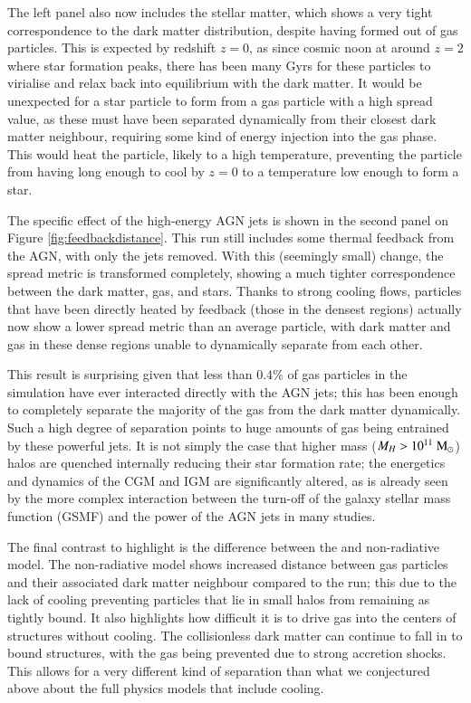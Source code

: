 The left panel also now includes the stellar matter, which shows a very tight
correspondence to the dark matter distribution, despite having formed out of
gas particles. This is expected by redshift $z=0$, as since cosmic noon at
around $z=2$ where star formation peaks, there has been many Gyrs for these
particles to virialise and relax back into equilibrium with the dark matter.
It would be unexpected for a star particle to form from a gas particle with a
high spread value, as these must have been separated dynamically from their
closest dark matter neighbour, requiring some kind of energy injection into
the gas phase. This would heat the particle, likely to a high temperature,
preventing the particle from having long enough to cool by $z=0$ to a
temperature low enough to form a star.

The specific effect of the high-energy AGN jets is shown in the second panel
on Figure \ref{fig:feedbackdistance}. This \nojet{} run still includes some
thermal feedback from the AGN, with only the jets removed. With this
(seemingly small) change, the spread metric is transformed completely,
showing a much tighter correspondence between the dark matter, gas, and
stars. Thanks to strong cooling flows, particles that have been directly
heated by feedback (those in the densest regions) actually now show a lower
spread metric than an average particle, with dark matter and gas in these
dense regions unable to dynamically separate from each other.

This result is surprising given that less than $0.4\%$ of gas particles in
the simulation have ever interacted directly with the AGN jets; this has been
enough to completely separate the majority of the gas from the dark matter
dynamically. Such a high degree of separation points to huge amounts of gas
being entrained by these powerful jets. It is not simply the case that higher
mass ($M_H > 10^{11} \;{\rm M}_{\odot}{}$) halos are quenched internally reducing their
star formation rate; the energetics and dynamics of the CGM and IGM are
significantly altered, as is already seen by the more complex interaction
between the turn-off of the galaxy stellar mass function (GSMF) and the power
of the AGN jets in many studies.

The final contrast to highlight is the difference between the \nojet{} and
non-radiative model. The non-radiative model shows increased distance between
gas particles and their associated dark matter neighbour compared to the
\nojet{} run; this due to the lack of cooling preventing particles that lie
in small halos from remaining as tightly bound. It also highlights how
difficult it is to drive gas into the centers of structures without cooling.
The collisionless dark matter can continue to fall in to bound structures,
with the gas being prevented due to strong accretion shocks. This allows for
a very different kind of separation than what we conjectured above about the
full physics models that include cooling.

